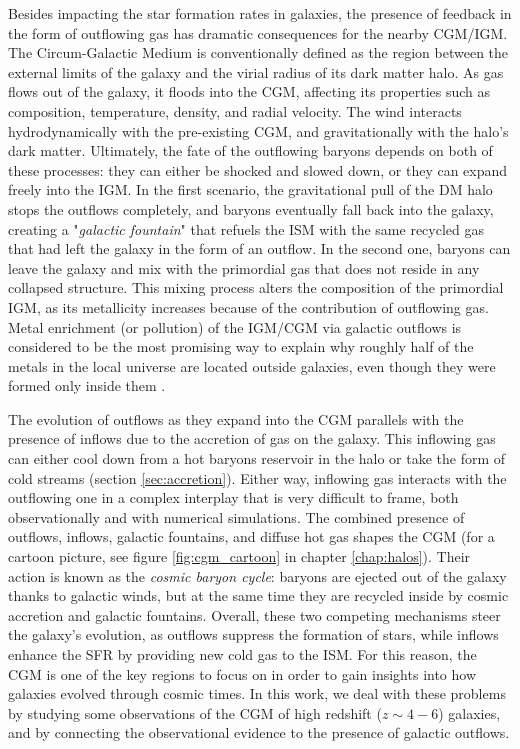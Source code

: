  Besides impacting the star formation rates in galaxies, the presence of feedback in the form of outflowing gas has dramatic consequences for the nearby CGM/IGM. The Circum-Galactic Medium is conventionally defined as the region between the external limits of the galaxy and the virial radius of its dark matter halo. As gas flows out of the galaxy, it floods into the CGM, affecting its properties such as composition, temperature, density, and radial velocity. The wind interacts hydrodynamically with the pre-existing CGM, and gravitationally with the halo's dark matter. Ultimately, the fate of the outflowing baryons depends on both of these processes: they can either be shocked and slowed down, or they can expand freely into the IGM. In the first scenario, the gravitational pull of the DM halo stops the outflows completely, and baryons eventually fall back into the galaxy, creating a "\textit{galactic fountain}" \citep{oppenheimer2006} that refuels the ISM with the same recycled gas that had left the galaxy in the form of an outflow. In the second one, baryons can leave the galaxy and mix with the primordial gas that does not reside in any collapsed structure. This mixing process alters the composition of the primordial IGM, as its metallicity increases because of the contribution of outflowing gas. Metal enrichment (or pollution) of the IGM/CGM via galactic outflows is considered to be the most promising way to explain why roughly half of the metals in the local universe are located outside galaxies, even though they were formed only inside them \citep{menard2010measuring}.
 
 The evolution of outflows as they expand into the CGM parallels with the presence of inflows due to the accretion of gas on the galaxy. This inflowing gas can either cool down from a hot baryons reservoir in the halo or take the form of cold streams  (section \ref{sec:accretion}). Either way, inflowing gas interacts with the outflowing one in a complex interplay that is very difficult to frame, both observationally and with numerical simulations. The combined presence of outflows, inflows, galactic fountains, and diffuse hot gas shapes the CGM (for a cartoon picture, see figure \ref{fig:cgm_cartoon} in chapter \ref{chap:halos}). Their action is known as the \textit{cosmic baryon cycle}: baryons are ejected out of the galaxy thanks to galactic winds, but at the same time they are recycled inside by cosmic accretion and galactic fountains. Overall, these two competing mechanisms steer the galaxy's evolution, as outflows suppress the formation of stars, while inflows enhance the SFR by providing new cold gas to the ISM. For this reason, the CGM is one of the key regions to focus on in order to gain insights into how galaxies evolved through cosmic times. In this work, we deal with these problems by studying some observations of the CGM of high redshift ($z\sim 4-6$) galaxies, and by connecting the observational evidence to the presence of galactic outflows.  

 
